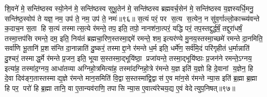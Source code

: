 शि॒वने॑ मे॒ सन्ति॑ष्ठस्व स्यो॒नेन॑  मे॒ सन्ति॑ष्ठस्व सुभू॒तेन॑  मे॒ सन्ति॑ष्ठस्व ब्रह्मवर्च॒सेन॑  मे॒ सन्ति॑ष्ठस्व य॒ज्ञस्यर्धि॒मनु॒ सन्ति॑ष्ठ॒स्वोप॑ ते यज्ञ॒ नम॒ उप॑ ते॒ नम॒ उप॑ ते॒ नमः॑॥९६॥ 
\anuvakamend
{}
स॒त्यं परं॒ पर स॒त्य स॒त्येन॒ न सु॑व॒र्गाल्लो॒काच्च्य॑वन्ते क॒दाच॒न स॒ता हि स॒त्यं तस्मात्स॒त्ये र॑मन्ते॒ तप॒ इति॒ तपो॒ नानश॑ना॒त्परं॒ यद्धि परं॒ तप॒स्तद्दुर्द्ध॑र्\mbox{}षं॒ तद्दुरा॑धर्\mbox{}षं॒ तस्मा॒त्तप॑सि रमन्ते॒ दम॒ इति॒ निय॑तं ब्रह्मचा॒रिण॒स्तस्मा॒द्दमे॑ रमन्ते॒ शम॒ इत्यर॑ण्ये मु॒नय॒स्तस्मा॒च्छमे॑ रमन्ते दा॒नमिति॒ सर्वा॑णि भू॒तानि॑ प्र॒शस॑न्ति दा॒नान्नाति॑ दु॒ष्करं॒ तस्माद्दा॒ने र॑मन्ते ध॒र्म इति॒ धर्मे॑ण॒ सर्व॑मि॒दं परि॑गृहीतं ध॒र्मान्नाति॑ दु॒श्चरं॒ तस्माद्ध॒र्मे र॑मन्ते प्र॒जन॒ इति॒ भूयास॒स्तस्मा॒द्भूयि॑ष्ठा॒ प्रजा॑यन्ते॒ तस्मा॒द्भूयि॑ष्ठाः प्र॒जन॑ने रमन्ते॒ऽग्नय॒ इत्या॑ह॒ तस्मा॑द॒ग्नय॒ आधा॑तव्या अग्निहो॒त्रमित्या॑ह॒ तस्मा॑दग्निहो॒त्रे र॑मन्ते य॒ज्ञ इति॑ य॒ज्ञो हि दे॒वानां य॒ज्ञेन॒ हि दे॒वा दिव॑ङ्ग॒तास्तस्माद्य॒ज्ञे र॑मन्ते मान॒समिति॑ वि॒द्वास॒स्तस्मा॑द्वि॒द्वास॑ ए॒व मा॑न॒से र॑मन्ते न्या॒स इति॑ ब्र॒ह्मा ब्र॒ह्मा हि पर॒ परो॑ हि ब्र॒ह्मा तानि॒ वा ए॒तान्यव॑राणि॒ तपासि न्या॒स ए॒वात्य॑रेचय॒द्य ए॒वं वेदेत्युप॒निषत्॥९७॥
\anuvakamend


